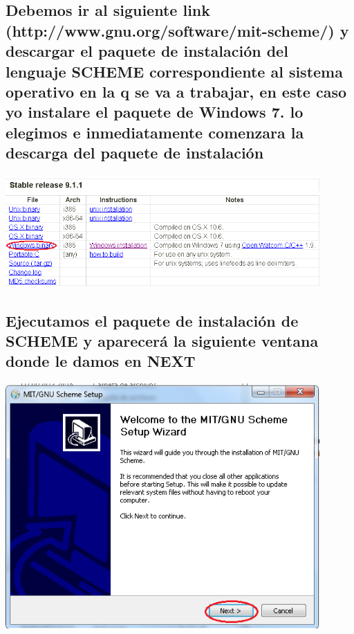\documentclass[11pt]{article} %
\begin{document}
\subsection{Debemos ir al siguiente link (http://www.gnu.org/software/mit-scheme/) y descargar el paquete de instalación del lenguaje SCHEME correspondiente al sistema operativo en la q se va a trabajar, en este caso yo instalare el paquete de Windows 7.
lo elegimos e inmediatamente comenzara la descarga del paquete de instalación}
\begin{center}
\includegraphics[width=12cm]{1.png}
\end{center}

\subsection{Ejecutamos el paquete de instalación de SCHEME y aparecerá la siguiente ventana donde le damos en NEXT}
\begin{center}
\includegraphics[width=12cm]{2.png}
\end{center}
\end{document}
